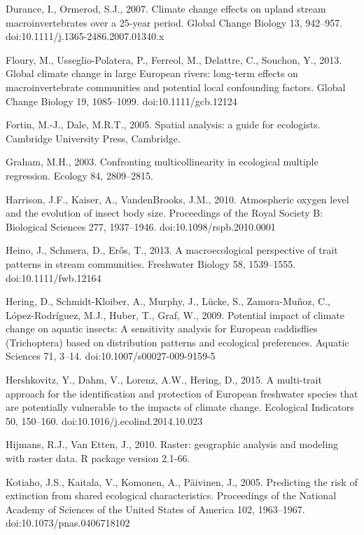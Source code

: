 \begin{thebibliography}
\bibitem{} \hangindent=1cm Durance, I., Ormerod, S.J., 2007. Climate change effects on upland stream macroinvertebrates over a 25-year period. Global Change Biology 13, 942–957. doi:10.1111/j.1365-2486.2007.01340.x

\bibitem{} \hangindent=1cm Floury, M., Usseglio-Polatera, P., Ferreol, M., Delattre, C., Souchon, Y., 2013. Global climate change in large European rivers: long-term effects on macroinvertebrate communities and potential local confounding factors. Global Change Biology 19, 1085–1099. doi:10.1111/gcb.12124

\bibitem{} \hangindent=1cm Fortin, M.-J., Dale, M.R.T., 2005. Spatial analysis: a guide for ecologists. Cambridge University Press, Cambridge.

\bibitem{} \hangindent=1cm Graham, M.H., 2003. Confronting multicollinearity in ecological multiple regression. Ecology 84, 2809–2815.

\bibitem{} \hangindent=1cm Harrison, J.F., Kaiser, A., VandenBrooks, J.M., 2010. Atmospheric oxygen level and the evolution of insect body size. Proceedings of the Royal Society B: Biological Sciences 277, 1937–1946. doi:10.1098/rspb.2010.0001

\bibitem{} \hangindent=1cm Heino, J., Schmera, D., Erős, T., 2013. A macroecological perspective of trait patterns in stream communities. Freshwater Biology 58, 1539–1555. doi:10.1111/fwb.12164

\bibitem{} \hangindent=1cm Hering, D., Schmidt-Kloiber, A., Murphy, J., Lücke, S., Zamora-Muñoz, C., López-Rodríguez, M.J., Huber, T., Graf, W., 2009. Potential impact of climate change on aquatic insects: A sensitivity analysis for European caddisflies (Trichoptera) based on distribution patterns and ecological preferences. Aquatic Sciences 71, 3–14. doi:10.1007/s00027-009-9159-5

\bibitem{} \hangindent=1cm Hershkovitz, Y., Dahm, V., Lorenz, A.W., Hering, D., 2015. A multi-trait approach for the identification and protection of European freshwater species that are potentially vulnerable to the impacts of climate change. Ecological Indicators 50, 150–160. doi:10.1016/j.ecolind.2014.10.023

\bibitem{} \hangindent=1cm Hijmans, R.J., Van Etten, J., 2010. Raster: geographic analysis and modeling with raster data. R package version 2.1-66.

\bibitem{} \hangindent=1cm Kotiaho, J.S., Kaitala, V., Komonen, A., Päivinen, J., 2005. Predicting the risk of extinction from shared ecological characteristics. Proceedings of the National Academy of Sciences of the United States of America 102, 1963–1967. doi:10.1073/pnas.0406718102


\end{thebibliography}
